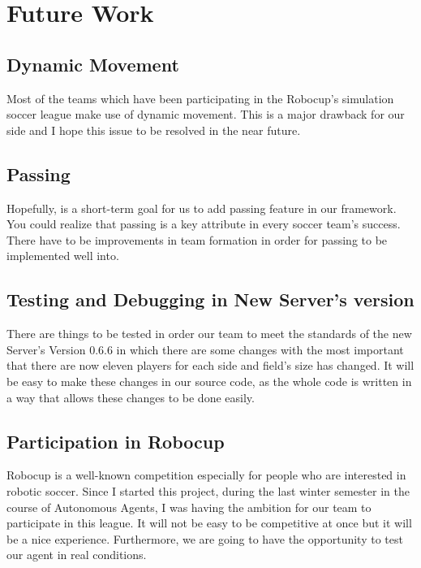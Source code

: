 \chapter{Future Work}
\label{future}
\section{Dynamic Movement}
Most of the teams which have been participating in the Robocup's simulation soccer league make use of dynamic movement. This is a major drawback for our side and I hope this issue to be resolved in the near future.
\section{Passing}
Hopefully, is a short-term goal for us to add passing feature in our framework. You could realize that passing is a key attribute in every soccer team's success. There have to be improvements in team formation in order for passing to be implemented well into.
\section{Testing and Debugging in New Server's version}
There are things to be tested in order our team to meet the standards of the new Server's Version 0.6.6 in which there are some changes with the most important that there are now eleven players for each side and field's size has changed. It will be easy to make these changes in our source code, as the whole code is written in a way that allows these changes to be done easily.
\section{Participation in Robocup}
Robocup is a well-known competition especially for people who are interested in robotic soccer. Since I started this project, during the last winter semester in the course of Autonomous Agents, I was having the ambition for our team to participate in this league. It will not be easy to be competitive at once but it will be a nice experience. Furthermore, we are going to have the opportunity to test our agent in real conditions.